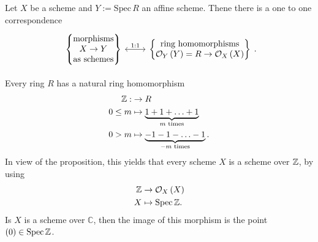 \begin{prop}
	Let $X$ be a scheme and $Y := \mathrm{Spec}\, R$ an affine scheme.
	Thene there is a one to one correspondence
	\begin{equation*}
	\begin{tikzcd}
		\left\{ 
		\begin{matrix}
			\text{morphisms}\\
			X \to Y\\
			\text{as schemes}
		\end{matrix} 
		\right\} \arrow[r, "1:1", leftrightarrow] &
		\left\{ 
		\begin{matrix}
			\text{ring homomorphisms}\\
			 \mathcal{O}_{Y} \left( Y \right) = R \to \mathcal{O}_{X} \left( X \right)\\
		\end{matrix} 
		\right\} 
	\end{tikzcd}
	.\end{equation*} 
\end{prop} 

\begin{rem}[]
	Every ring $R$ has a natural ring homomorphism
	\begin{align}
		\mathbb{Z}:  &\to R \\
		0 \leq m &\mapsto \underbrace{1 + 1 + \ldots + 1}_{m \text{ times}}\\
		0 > m &\mapsto \underbrace{- 1 - 1 - \ldots - 1}_{-m \text{ times}}
	.\end{align} 
	In view of the proposition, this yields that every scheme $X$ is a
	scheme over $\mathbb{Z}$, by using
	\begin{align}
		\mathbb{Z} &\to \mathcal{O}_{X} \left( X \right) \\
		X &\mapsto \mathrm{Spec}\, \mathbb{Z}
	.\end{align} 
	Is $X$ is a scheme over $\mathbb{C}$, then the image of
	this morphism is the point
	$(0) \in \mathrm{Spec}\, \mathbb{Z}$.
\end{rem}

